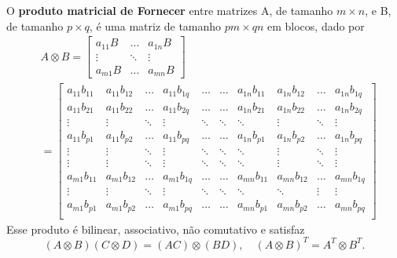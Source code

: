 \documentclass[../differential_methods.tex]{subfiles}
\begin{document}
\begin{tcolorbox}[
		skin=enhanced,
		title=Lembrete!,
		after title={\hfill Produto Matricial de Kronecker},
		fonttitle=\bfseries,
		sharp corners=downhill,
		colframe=black,
		colbacktitle=yellow!75!white,
		colback=yellow!30,
		colbacklower=black,
		coltitle=black,
		drop large lifted shadow
	]
	O \hypertarget{kronecker_matrix}{\textbf{produto matricial de Fornecer}} entre matrizes A, de tamanho \(m\times n\), e B, de tamanho \(p\times q\), é uma matriz de tamanho \(pm \times qn\) em blocos, dado por
	\begin{align*}
		 & A \otimes B = \begin{bmatrix}
			                 a_{11}B & \dotsc & a_{1n}B \\
			                 \vdots  & \ddots & \vdots  \\
			                 a_{m1}B & \dotsc & a_{mn}B
		                 \end{bmatrix}                                                                                      \\
		 & = \begin{bmatrix}
			     a_{11}b_{11} & a_{11}b_{12} & \dotsc & a_{11}b_{1q} & \dotsc & \dotsc & a_{1n}b_{11} & a_{1n}b_{12} & \dotsc & a_{1n}b_{1q} \\
			     a_{11}b_{21} & a_{11}b_{22} & \dotsc & a_{11}b_{2q} & \dotsc & \dotsc & a_{1n}b_{21} & a_{1n}b_{22} & \dotsc & a_{1n}b_{2q} \\
			     \vdots       & \vdots       & \ddots & \vdots       & \ddots & \ddots & \ddots       & \vdots       & \ddots & \vdots       \\
			     a_{11}b_{p1} & a_{11}b_{p2} & \dotsc & a_{11}b_{pq} & \dotsc & \dotsc & a_{1n}b_{p1} & a_{1n}b_{p2} & \dotsc & a_{1n}b_{pq} \\
			     \vdots       & \vdots       & \ddots & \vdots       & \ddots & \ddots & \ddots       & \vdots       & \ddots & \vdots       \\
			     \vdots       & \vdots       & \ddots & \vdots       & \ddots & \ddots & \ddots       & \vdots       & \ddots & \vdots       \\
			     a_{m1}b_{11} & a_{m1}b_{12} & \dotsc & a_{m1}b_{1q} & \dotsc & \dotsc & a_{mn}b_{11} & a_{mn}b_{12} & \dotsc & a_{mn}b_{1q} \\
			     \vdots       & \vdots       & \ddots & \vdots       & \ddots & \ddots & \ddots       & \ddots       & \vdots & \vdots       \\
			     a_{m1}b_{p1} & a_{m1}b_{p2} & \dotsc & a_{m1}b_{pq} & \dotsc & \dotsc & a_{mn}b_{p1} & a_{mn}b_{p2} & \dotsc & a_{mn}b_{pq} \\
		     \end{bmatrix}
	\end{align*}
	Esse produto é bilinear, associativo, não comutativo e satisfaz
	\[
		(A\otimes B)(C\otimes D)=(AC)\otimes (BD),\quad (A\otimes B)^{T}=A^{T}\otimes B^{T}.
	\]
\end{tcolorbox}
\end{document}
